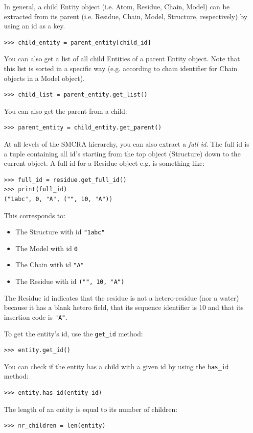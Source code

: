 In general, a child Entity object (i.e. Atom, Residue, Chain, Model) can be
extracted from its parent (i.e. Residue, Chain, Model, Structure, respectively)
by using an id as a key.

\begin{verbatim}
>>> child_entity = parent_entity[child_id]
\end{verbatim}

You can also get a list of all child Entities of a parent Entity object. Note
that this list is sorted in a specific way (e.g. according to chain identifier
for Chain objects in a Model object).

\begin{verbatim}
>>> child_list = parent_entity.get_list()
\end{verbatim}

You can also get the parent from a child:
\begin{verbatim}
>>> parent_entity = child_entity.get_parent()
\end{verbatim}

At all levels of the SMCRA hierarchy, you can also extract a \emph{full id}.
The full id is a tuple containing all id's starting from the top object (Structure)
down to the current object. A full id for a Residue object e.g. is something
like:

\begin{verbatim}
>>> full_id = residue.get_full_id()
>>> print(full_id)
("1abc", 0, "A", ("", 10, "A"))
\end{verbatim}

This corresponds to:

\begin{itemize}
\item The Structure with id \verb|"1abc"|
\item The Model with id \verb|0|
\item The Chain with id \verb|"A"|
\item The Residue with id \verb|("", 10, "A")|
\end{itemize}
The Residue id indicates that the residue is not a hetero-residue (nor a water)
because it has a blank hetero field, that its sequence identifier is 10 and
that its insertion code is \verb|"A"|.

To get the entity's id, use the \verb+get_id+ method:
\begin{verbatim}
>>> entity.get_id()
\end{verbatim}
You can check if the entity has a child with a given id by using the \verb+has_id+ method:
\begin{verbatim}
>>> entity.has_id(entity_id)
\end{verbatim}
The length of an entity is equal to its number of children:
\begin{verbatim}
>>> nr_children = len(entity)
\end{verbatim}

